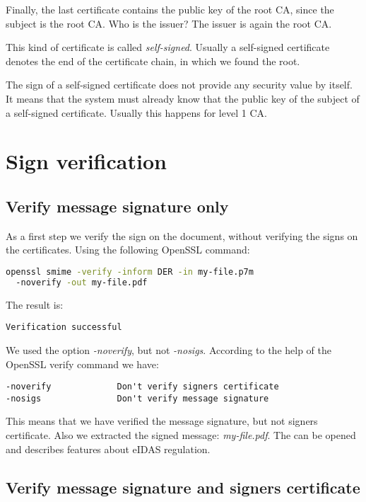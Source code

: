 \documentclass{article}
\begin{document}
Finally, the last certificate contains the public key of the root CA,
since the subject is the root CA.
Who is the issuer? The issuer is again the root CA.

This kind of certificate is called \emph{self-signed}.
Usually a self-signed certificate denotes the end of the certificate chain,
in which we found the root.

The sign of a self-signed certificate does not provide any security
value by itself. It means that the system must already know
that the public key of the subject of a self-signed certificate. 
Usually this happens  for level 1 CA.

\section{Sign verification}

\subsection{Verify message signature only}

As a first step we verify the sign on the document, without verifying the
signs on the certificates. Using the following OpenSSL command:

\begin{lstlisting}[language=bash]
openssl smime -verify -inform DER -in my-file.p7m 
  -noverify -out my-file.pdf
\end{lstlisting}

The result is:
\begin{verbatim}
Verification successful
\end{verbatim}

We used the option \emph{-noverify}, but not \emph{-nosigs}.
According to the help of the OpenSSL verify command we have:

\begin{verbatim}
-noverify             Don't verify signers certificate
-nosigs               Don't verify message signature
\end{verbatim}

This means that we have verified the message signature, but not signers certificate.
Also we extracted the signed message: \emph{my-file.pdf}.
The can be opened and describes features about eIDAS regulation.

\subsection{Verify message signature and signers certificate}
\end{document}
